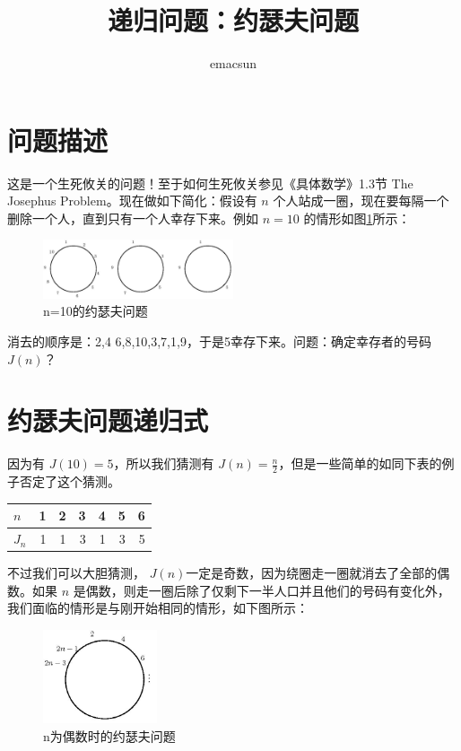 \documentclass[10pt,a4paper,UTF8]{article}
\author{emacsun}
\date{}
\title{递归问题：约瑟夫问题}
\begin{document}
\xiaosihao\maketitle
\tableofcontents


\section{问题描述}
\label{sec:orgheadline1}


这是一个生死攸关的问题！至于如何生死攸关参见《具体数学》1.3节 The Josephus Problem。现在做如下简化：假设有 \(n\) 个人站成一圈，现在要每隔一个删除一个人，直到只有一个人幸存下来。例如 \(n=10\) 的情形如图\ref{fig:orgparagraph1}所示：

\begin{figure}[htb]
\centering
\includegraphics[width=0.5\textwidth]{../../img/josephus-10.jpg}
\caption{\label{fig:orgparagraph1}
n=10的约瑟夫问题}
\end{figure}

消去的顺序是：2,4 6,8,10,3,7,1,9，于是5幸存下来。问题：确定幸存者的号码 \(J(n)\)？

\section{约瑟夫问题递归式}
\label{sec:orgheadline2}


因为有 \(J(10)=5\)，所以我们猜测有 \(J(n)= \frac{n}{2}\)，但是一些简单的如同下表的例子否定了这个猜测。


\begin{center}
\begin{tabular}{lrrrrrr}
\(n\) & 1 & 2 & 3 & 4 & 5 & 6\\
\hline
\({J_{n}}\) & 1 & 1 & 3 & 1 & 3 & 5\\
\end{tabular}
\end{center}


不过我们可以大胆猜测， \(J(n)\)一定是奇数，因为绕圈走一圈就消去了全部的偶数。如果 \(n\) 是偶数，则走一圈后除了仅剩下一半人口并且他们的号码有变化外，我们面临的情形是与刚开始相同的情形，如下图所示：
\begin{figure}[htb]
\centering
\includegraphics[width=0.3\textwidth]{../../img/josephus-n-even.jpg}
\caption{n为偶数时的约瑟夫问题}
\end{figure}
\end{document}
